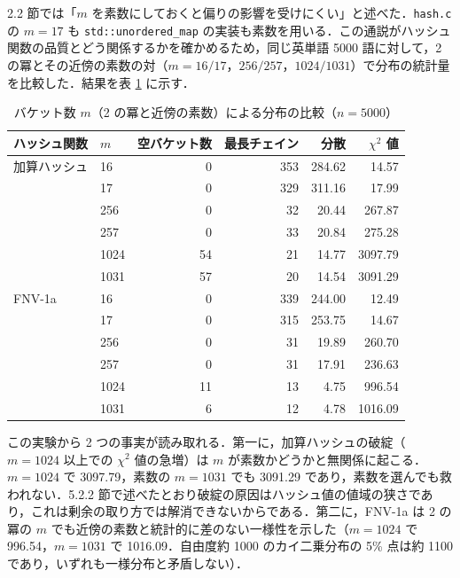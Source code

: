 2.2 節では「$m$ を素数にしておくと偏りの影響を受けにくい」と述べた．{\tt hash.c} の $m=17$ も {\tt std::unordered\_map} の実装も素数を用いる．この通説がハッシュ関数の品質とどう関係するかを確かめるため，同じ英単語 5000 語に対して，2 の冪とその近傍の素数の対（$m = 16/17$，$256/257$，$1024/1031$）で分布の統計量を比較した．結果を表 \ref{tab:tablesize} に示す．

\begin{table}[htbp]
\centering
\caption{バケット数 $m$（2 の冪と近傍の素数）による分布の比較（$n=5000$）}
\label{tab:tablesize}
\begin{tabular}{llrrrr}
\hline
ハッシュ関数 & $m$ & 空バケット数 & 最長チェイン & 分散 & $\chi^2$ 値 \\
\hline
加算ハッシュ & 16   & 0  & 353 & 284.62 & 14.57 \\
             & 17   & 0  & 329 & 311.16 & 17.99 \\
             & 256  & 0  & 32  & 20.44  & 267.87 \\
             & 257  & 0  & 33  & 20.84  & 275.28 \\
             & 1024 & 54 & 21  & 14.77  & 3097.79 \\
             & 1031 & 57 & 20  & 14.54  & 3091.29 \\
\hline
FNV-1a       & 16   & 0  & 339 & 244.00 & 12.49 \\
             & 17   & 0  & 315 & 253.75 & 14.67 \\
             & 256  & 0  & 31  & 19.89  & 260.70 \\
             & 257  & 0  & 31  & 17.91  & 236.63 \\
             & 1024 & 11 & 13  & 4.75   & 996.54 \\
             & 1031 & 6  & 12  & 4.78   & 1016.09 \\
\hline
\end{tabular}
\end{table}

この実験から 2 つの事実が読み取れる．第一に，加算ハッシュの破綻（$m=1024$ 以上での $\chi^2$ 値の急増）は $m$ が素数かどうかと無関係に起こる．$m=1024$ で 3097.79，素数の $m=1031$ でも 3091.29 であり，素数を選んでも救われない．5.2.2 節で述べたとおり破綻の原因はハッシュ値の値域の狭さであり，これは剰余の取り方では解消できないからである．第二に，FNV-1a は 2 の冪の $m$ でも近傍の素数と統計的に差のない一様性を示した（$m=1024$ で 996.54，$m=1031$ で 1016.09．自由度約 1000 のカイ二乗分布の 5\% 点は約 1100 であり，いずれも一様分布と矛盾しない）．

